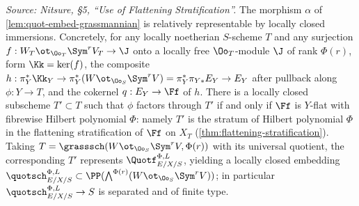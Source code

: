 \begin{lemma}
  \label{lem:quot-flattening-stratum}
  \textit{Source: Nitsure, §5, ``Use of Flattening Stratification''.}
  The morphism $\alpha$ of \cref{lem:quot-embed-grassmannian} is relatively
  representable by locally closed immersions. Concretely, for any locally
  noetherian $S$-scheme $T$ and any surjection
  $f : W_T \ot_{\Oo_T}\Sym^r V_T \to \J$ onto a locally free $\Oo_T$-module $\J$
  of rank $\Phi(r)$, form $\Kk = \ker(f)$, the composite
  $h : \pi_Y^*\Kk_Y \to \pi_Y^*(W \ot_{\Oo_S}\Sym^r V) = \pi_Y^*\pi_{Y*}E_Y \to E_Y$
  after pullback along $\phi : Y \to T$, and the cokernel $q : E_Y \to \Ff$ of
  $h$. There is a locally closed subscheme $T' \subset T$ such that $\phi$
  factors through $T'$ if and only if $\Ff$ is $Y$-flat with fibrewise Hilbert
  polynomial $\Phi$: namely $T'$ is the stratum of Hilbert polynomial $\Phi$ in
  the flattening stratification of $\Ff$ on $X_T$
  (\cref{thm:flattening-stratification}). Taking
  $T = \grasssch(W \ot_{\Oo_S}\Sym^r V, \Phi(r))$ with its universal quotient,
  the corresponding $T'$ represents $\Quotf_{E/X/S}^{\Phi,L}$, yielding a locally
  closed embedding
  $\quotsch_{E/X/S}^{\Phi,L} \subset \PP(\bigwedge^{\Phi(r)}(W \ot_{\Oo_S}\Sym^r V))$;
  in particular $\quotsch_{E/X/S}^{\Phi,L} \to S$ is separated and of finite type.
\end{lemma}


